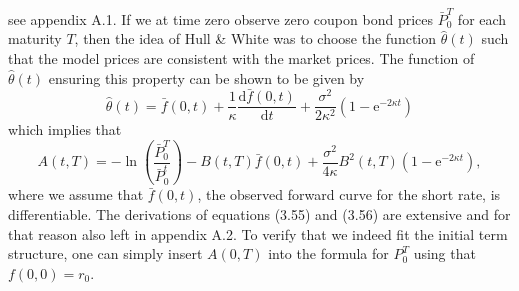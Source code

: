 \documentclass[12pt,twoside]{reedthesis}
\begin{document}
see appendix A.1. If we at time zero observe zero coupon bond prices \(\bar{P}_{0}^{T}\) for each maturity \(T\), then the idea of Hull \& White was to choose the function \(\hat{\theta}(t)\) such that the model prices are consistent with the market prices. The function of \(\hat{\theta}(t)\) ensuring this property can be shown to be given by
\[
\hat{\theta}(t)=\bar{f}(0, t)+\frac{1}{\kappa} \frac{\mathrm{d} \bar{f}(0, t)}{\mathrm{d} t}+\frac{\sigma^{2}}{2 \kappa^{2}}\left(1-\mathrm{e}^{-2 \kappa t}\right)
\]
which implies that
\[
A(t, T)=-\ln \left(\frac{\bar{P}_{0}^{T}}{\bar{P}_{0}^{t}}\right)-B(t, T) \bar{f}(0, t)+\frac{\sigma^{2}}{4 \kappa} B^{2}(t, T)\left(1-\mathrm{e}^{-2 \kappa t}\right),
\]
where we assume that \(\bar{f}(0, t)\), the observed forward curve for the short rate, is differentiable. The derivations of equations (3.55) and (3.56) are extensive and for that reason also left in appendix A.2. To verify that we indeed fit the initial term structure, one can simply insert \(A(0, T)\) into the formula for \(P_{0}^{T}\) using that \(f(0,0)=r_{0}\).
\end{document}
